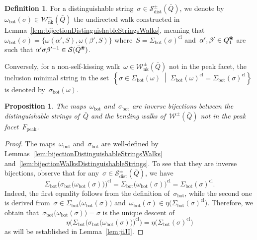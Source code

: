 \documentclass{memo-l}
\newtheorem{proposition}[theorem]{Proposition}
\theoremstyle{definition}
\newtheorem{definition}[theorem]{Definition}
\newcommand{\set}[2]{\left\{ #1 \;\middle|\; #2 \right\}} %
\newcommand{\blossom}{^\text{\ding{96}}} %
\newcommand{\strings}{\mathcal{S}} %
\newcommand{\distinguishableStrings}{\mathcal{S}_\mathrm{dist}} %
\newcommand{\walks}{\mathcal{W}} %
\newcommand{\NKWalks}{\mathcal{W}_\mathrm{nk}} %
\newcommand{\peak}{\mathrm{peak}} %
\newcommand{\bottom}{\mathrm{bot}} %
\newcommand{\closure}[1]{#1^{\mathrm{cl}}} %
\begin{document}
\begin{definition}
\label{def:bijectionWalksDistinguishableStrings}
For a distinguishable string~$\sigma \in \distinguishableStrings^\pm(\bar Q)$, we denote by $\omega_\bottom(\sigma) \in \NKWalks^\pm(\bar Q)$ the undirected walk constructed in Lemma~\ref{lem:bijectionDistinguishableStringsWalks}, meaning that ${\omega_\bottom(\sigma) = \{\omega(\alpha',S), \omega(\beta',S)\}}$ where~$S = \closure{\Sigma_\bottom(\sigma)}$ and~$\alpha', \beta' \in Q\blossom_1$ are such that ${\alpha'\sigma\beta'^{-1} \in \strings(\bar Q\blossom)}$.

Conversely, for a non-self-kissing walk~$\omega \in \NKWalks^\pm(\bar Q)$ not in the peak facet, the inclusion minimal string in the set~$\set{\sigma \in \Sigma_\bottom(\omega)}{\closure{\Sigma_\bottom(\omega)} = \closure{\Sigma_\bottom(\sigma)}}$ is denoted by~$\sigma_\bottom(\omega)$.
\end{definition}

\begin{proposition}
\label{prop:bijectionDistinguishableStringsWalks}
The maps~$\omega_\bottom$ and~$\sigma_\bottom$ are inverse bijections between the distinguishable strings of~$\bar Q$ and the bending walks of~$\walks^\pm(\bar Q)$ not in the peak facet~$F_\peak$.
\end{proposition}

\begin{proof}
The maps~$\omega_\bottom$ and~$\sigma_\bottom$ are well-defined by Lemmas~\ref{lem:bijectionDistinguishableStringsWalks} and~\ref{lem:bijectionWalksDistinguishableStrings}.
To see that they are inverse bijections, observe that for any~$\sigma \in \distinguishableStrings^\pm(\bar Q)$, we have\[
\closure{ \Sigma_\bottom \big( \sigma_\bottom \big( \omega_\bottom(\sigma) \big) \big)}
= \closure{\Sigma_\bottom \big( \omega_\bottom(\sigma) \big)}
= \closure{\Sigma_\bottom(\sigma)}.
\]
Indeed, the first equality follows from the definition of~$\sigma_\bottom$, while the second one is derived from~$\sigma \in \Sigma_\bottom \big( \omega_\bottom(\sigma) \big)$ and~$\omega_\bottom(\sigma) \in \eta \big( \closure{\Sigma_\bottom(\sigma)} \big)$.
Therefore, we obtain that~$\sigma_\bottom \big( \omega_\bottom(\sigma) \big) = \sigma$ is the unique descent of
\[
\eta \big( \closure{ \Sigma_\bottom \big( \sigma_\bottom \big( \omega_\bottom(\sigma) \big) \big)} \big) = \eta \big( \closure{\Sigma_\bottom(\sigma)} \big)
\]
as will be established in Lemma~\ref{lem:jiJI}.
\end{proof}
\end{document}
